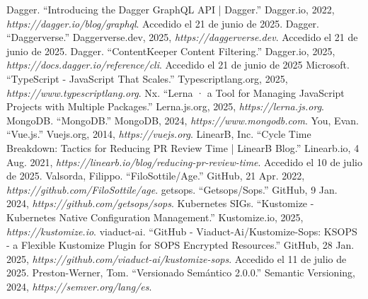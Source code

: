 \begin{thebibliography}{99}
 Dagger. ``Introducing the Dagger GraphQL API | Dagger.'' Dagger.io, 2022, {\it https://dagger.io/blog/graphql}. Accedido el 21 de junio de 2025.
 Dagger. ``Daggerverse.'' Daggerverse.dev, 2025, {\it https://daggerverse.dev}. Accedido el 21 de junio de 2025.
 Dagger. ``ContentKeeper Content Filtering.'' Dagger.io, 2025, {\it https://docs.dagger.io/reference/cli}. Accedido el 21 de junio de 2025
 Microsoft. ``TypeScript - JavaScript That Scales.'' Typescriptlang.org, 2025, {\it https://www.typescriptlang.org}.
 Nx. ``Lerna · a Tool for Managing JavaScript Projects with Multiple Packages.'' Lerna.js.org, 2025, {\it https://lerna.js.org}.
 MongoDB. ``MongoDB.'' MongoDB, 2024, {\it https://www.mongodb.com}.
 You, Evan. ``Vue.js.'' Vuejs.org, 2014, {\it https://vuejs.org}.
 LinearB, Inc. ``Cycle Time Breakdown: Tactics for Reducing PR Review Time | LinearB Blog.'' Linearb.io, 4 Aug. 2021, {\it https://linearb.io/blog/reducing-pr-review-time}. Accedido el 10 de julio de 2025.
 Valsorda, Filippo. ``FiloSottile/Age.'' GitHub, 21 Apr. 2022, {\it https://github.com/FiloSottile/age}.
 getsops. ``Getsops/Sops.'' GitHub, 9 Jan. 2024, {\it https://github.com/getsops/sops}.
 Kubernetes SIGs. ``Kustomize - Kubernetes Native Configuration Management.'' Kustomize.io, 2025, {\it https://kustomize.io}.
 viaduct-ai. ``GitHub - Viaduct-Ai/Kustomize-Sops: KSOPS - a Flexible Kustomize Plugin for SOPS Encrypted Resources.'' GitHub, 28 Jan. 2025, {\it https://github.com/viaduct-ai/kustomize-sops}. Accedido el 11 de julio de 2025.
 Preston-Werner, Tom. ``Versionado Semántico 2.0.0.'' Semantic Versioning, 2024, {\it https://semver.org/lang/es}.
\end{thebibliography}

